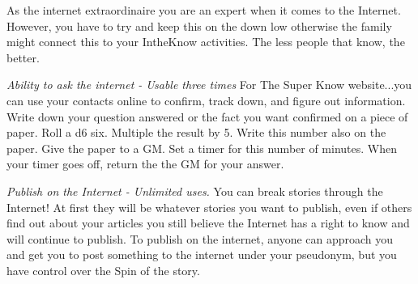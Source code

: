 \documentclass[green]{LRSguildcamp1}
\begin{document}
\name{\gInternetPR{}}

As \cTween{} the internet extraordinaire you are an expert when it comes to the Internet. However, you have to try and keep this on the down low otherwise the family might connect this to your IntheKnow activities. The less people that know, the better. 

\textit{Ability to ask the internet - Usable three times
}
For The Super Know website...you can use your contacts online to confirm, track down, and figure out information. Write down your question answered or the fact you want confirmed on a piece of paper. Roll a d6 six. Multiple the result by 5. Write this number also on the paper. Give the paper to a GM. Set a timer for this number of minutes. When your timer goes off, return the the GM for your answer. 

\textit{Publish on the Internet - Unlimited uses.
}
You can break stories through the Internet! At first they will be whatever stories you want to publish, even if others find out about your articles you still believe the Internet has a right to know and will continue to publish. To publish on the internet, anyone can approach you and get you to post something to the internet under your pseudonym, but you have control over the Spin of the story. 
\end{document}
